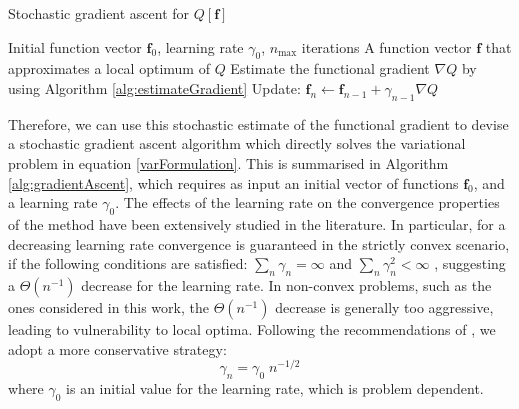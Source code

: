 \begin{algorithm}[ht!]
\caption{Stochastic gradient ascent for $Q[\mathbf{f}]$}
\label{alg:gradientAscent}
\begin{algorithmic}
\REQUIRE Initial function vector $\mathbf{f}_0$, learning rate $\gamma_0$, $n_{\max}$ iterations
\ENSURE A function vector $\mathbf{f}$ that approximates a local optimum of $Q$
		\STATE Estimate the functional gradient $\nabla Q$ by using Algorithm \ref{alg:estimateGradient}
		\STATE Update: $\mathbf{f}_n \leftarrow \mathbf{f}_{n-1} + \gamma_{n-1} \nabla Q$
	\ENDFOR
\end{algorithmic}
\end{algorithm}


Therefore, we can use this stochastic estimate of the functional gradient to devise a stochastic gradient ascent algorithm which directly solves the variational problem in equation \eqref{varFormulation}.
This is summarised in Algorithm \ref{alg:gradientAscent}, which requires as input an initial vector of functions $\mathbf{f}_0$, and a learning rate $\gamma_0$.
The effects of the learning rate on the convergence properties of the method have been extensively studied in the literature.
In particular, for a decreasing learning rate convergence is guaranteed in the strictly convex scenario, if the following conditions are satisfied: $\sum_{n} \gamma_n = \infty$ and $\sum_{n} \gamma^2_n < \infty$ \cite{Murata1999,Bottou2010}, suggesting a $\Theta(n^{-1})$ decrease for the learning rate.
In non-convex problems, such as the ones considered in this work, the $\Theta(n^{-1})$ decrease is generally too aggressive, leading to vulnerability to local optima.
Following the recommendations of \cite{Bottou2012}, we adopt a more conservative strategy:
\begin{equation}
\gamma_n = \gamma_0\; n^{-1/2}
\end{equation}
where $\gamma_0$ is an initial value for the learning rate, which is problem dependent.
















